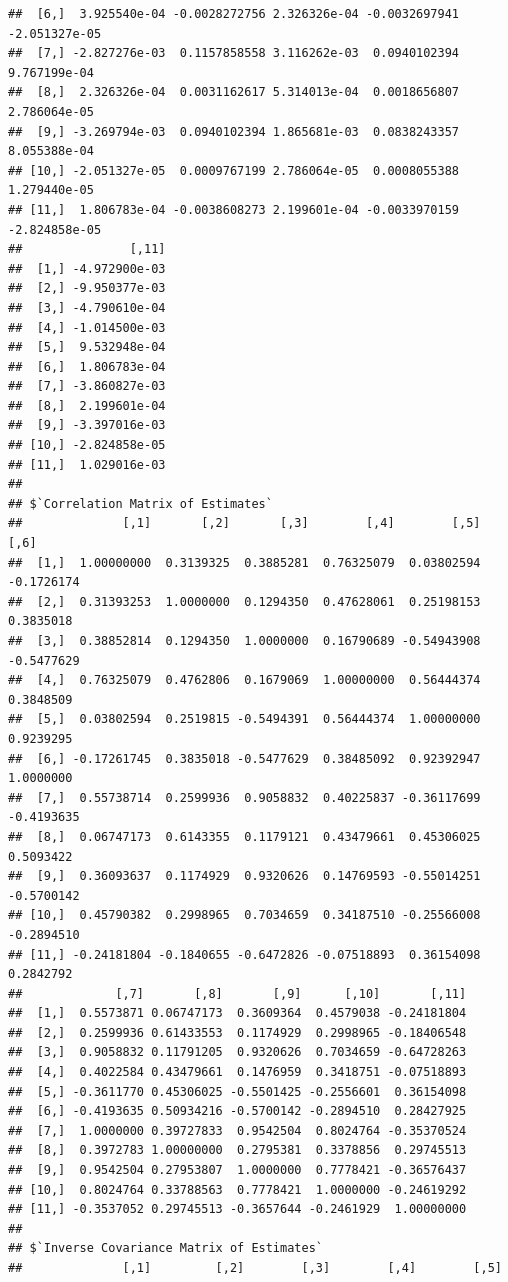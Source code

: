 \documentclass[
  10pt,
]{krantz}
\begin{document}
\begin{verbatim}
##  [6,]  3.925540e-04 -0.0028272756 2.326326e-04 -0.0032697941 -2.051327e-05
##  [7,] -2.827276e-03  0.1157858558 3.116262e-03  0.0940102394  9.767199e-04
##  [8,]  2.326326e-04  0.0031162617 5.314013e-04  0.0018656807  2.786064e-05
##  [9,] -3.269794e-03  0.0940102394 1.865681e-03  0.0838243357  8.055388e-04
## [10,] -2.051327e-05  0.0009767199 2.786064e-05  0.0008055388  1.279440e-05
## [11,]  1.806783e-04 -0.0038608273 2.199601e-04 -0.0033970159 -2.824858e-05
##               [,11]
##  [1,] -4.972900e-03
##  [2,] -9.950377e-03
##  [3,] -4.790610e-04
##  [4,] -1.014500e-03
##  [5,]  9.532948e-04
##  [6,]  1.806783e-04
##  [7,] -3.860827e-03
##  [8,]  2.199601e-04
##  [9,] -3.397016e-03
## [10,] -2.824858e-05
## [11,]  1.029016e-03
## 
## $`Correlation Matrix of Estimates`
##              [,1]       [,2]       [,3]        [,4]        [,5]       [,6]
##  [1,]  1.00000000  0.3139325  0.3885281  0.76325079  0.03802594 -0.1726174
##  [2,]  0.31393253  1.0000000  0.1294350  0.47628061  0.25198153  0.3835018
##  [3,]  0.38852814  0.1294350  1.0000000  0.16790689 -0.54943908 -0.5477629
##  [4,]  0.76325079  0.4762806  0.1679069  1.00000000  0.56444374  0.3848509
##  [5,]  0.03802594  0.2519815 -0.5494391  0.56444374  1.00000000  0.9239295
##  [6,] -0.17261745  0.3835018 -0.5477629  0.38485092  0.92392947  1.0000000
##  [7,]  0.55738714  0.2599936  0.9058832  0.40225837 -0.36117699 -0.4193635
##  [8,]  0.06747173  0.6143355  0.1179121  0.43479661  0.45306025  0.5093422
##  [9,]  0.36093637  0.1174929  0.9320626  0.14769593 -0.55014251 -0.5700142
## [10,]  0.45790382  0.2998965  0.7034659  0.34187510 -0.25566008 -0.2894510
## [11,] -0.24181804 -0.1840655 -0.6472826 -0.07518893  0.36154098  0.2842792
##             [,7]       [,8]       [,9]      [,10]       [,11]
##  [1,]  0.5573871 0.06747173  0.3609364  0.4579038 -0.24181804
##  [2,]  0.2599936 0.61433553  0.1174929  0.2998965 -0.18406548
##  [3,]  0.9058832 0.11791205  0.9320626  0.7034659 -0.64728263
##  [4,]  0.4022584 0.43479661  0.1476959  0.3418751 -0.07518893
##  [5,] -0.3611770 0.45306025 -0.5501425 -0.2556601  0.36154098
##  [6,] -0.4193635 0.50934216 -0.5700142 -0.2894510  0.28427925
##  [7,]  1.0000000 0.39727833  0.9542504  0.8024764 -0.35370524
##  [8,]  0.3972783 1.00000000  0.2795381  0.3378856  0.29745513
##  [9,]  0.9542504 0.27953807  1.0000000  0.7778421 -0.36576437
## [10,]  0.8024764 0.33788563  0.7778421  1.0000000 -0.24619292
## [11,] -0.3537052 0.29745513 -0.3657644 -0.2461929  1.00000000
## 
## $`Inverse Covariance Matrix of Estimates`
##              [,1]         [,2]        [,3]        [,4]        [,5]

\end{verbatim}
\end{document}
